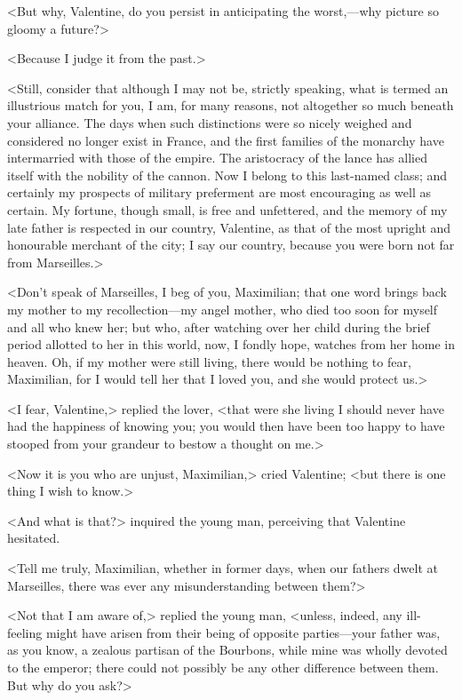  <But why, Valentine, do you persist in anticipating the worst,—why picture so gloomy a future?> 

 <Because I judge it from the past.> 

 <Still, consider that although I may not be, strictly speaking, what is termed an illustrious match for you, I am, for many reasons, not altogether so much beneath your alliance. The days when such distinctions were so nicely weighed and considered no longer exist in France, and the first families of the monarchy have intermarried with those of the empire. The aristocracy of the lance has allied itself with the nobility of the cannon. Now I belong to this last-named class; and certainly my prospects of military preferment are most encouraging as well as certain. My fortune, though small, is free and unfettered, and the memory of my late father is respected in our country, Valentine, as that of the most upright and honourable merchant of the city; I say our country, because you were born not far from Marseilles.> 

 <Don't speak of Marseilles, I beg of you, Maximilian; that one word brings back my mother to my recollection—my angel mother, who died too soon for myself and all who knew her; but who, after watching over her child during the brief period allotted to her in this world, now, I fondly hope, watches from her home in heaven. Oh, if my mother were still living, there would be nothing to fear, Maximilian, for I would tell her that I loved you, and she would protect us.> 

 <I fear, Valentine,> replied the lover, <that were she living I should never have had the happiness of knowing you; you would then have been too happy to have stooped from your grandeur to bestow a thought on me.> 

 <Now it is you who are unjust, Maximilian,> cried Valentine; <but there is one thing I wish to know.> 

 <And what is that?> inquired the young man, perceiving that Valentine hesitated. 

 <Tell me truly, Maximilian, whether in former days, when our fathers dwelt at Marseilles, there was ever any misunderstanding between them?> 

 <Not that I am aware of,> replied the young man, <unless, indeed, any ill-feeling might have arisen from their being of opposite parties—your father was, as you know, a zealous partisan of the Bourbons, while mine was wholly devoted to the emperor; there could not possibly be any other difference between them. But why do you ask?> 

